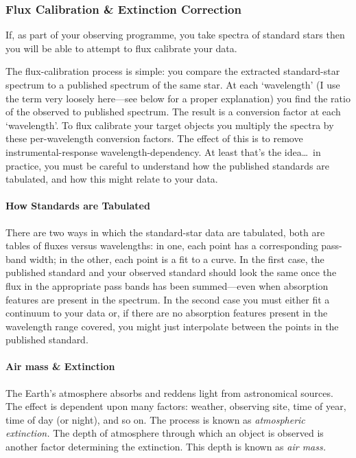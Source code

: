\documentclass[twoside,11pt]{starlink}
\providecommand{\mlabel}[1]{\xlabel{#1}\label{#1}}
\providecommand{\scspec}[2]{#1}
\begin{document}
\subsubsection{\mlabel{flux_calibration}Flux Calibration \&
               Extinction Correction}

If, as part of your observing programme, you take spectra of standard stars
then you will be able to attempt to flux calibrate your data.

The flux-calibration process is simple: you compare the extracted
standard-star spectrum to a published spectrum of the same star.  At each
`wavelength' (I use the term very loosely here\scspec{---}{ - }see below for a
proper explanation) you find the ratio of the observed to published spectrum.
The result is a conversion factor at each `wavelength'.
To flux calibrate your target objects you multiply the spectra by these
per-wavelength conversion factors.  The effect of this is to remove
instrumental-response wavelength-dependency.  At least that's the
idea\ldots\ in practice, you must be careful to understand how the
published standards are tabulated, and how this might relate to your data.

\paragraph{How Standards are Tabulated}

There are two ways in which the standard-star data are tabulated,
both are tables of fluxes versus wavelengths:
in one, each point has a corresponding pass-band width;
in the other, each point is a fit to a
 curve.
In the first case, the published standard and your observed standard should
look the same once the flux in the appropriate pass bands has been
summed\scspec{---}{ - }even when absorption features are present in the
spectrum.  In the second case you must either fit a continuum to your
data or, if there are no absorption features present in the wavelength range
covered, you might just interpolate between the points in the published
standard.

\paragraph{\mlabel{airmass}Air mass \& Extinction}

The Earth's atmosphere absorbs and reddens light from astronomical sources.
The effect is dependent upon many factors: weather, observing site, time of
year, time of day (or night), and so on.
The process is known as {\sl atmospheric extinction.}
The depth of atmosphere through which an object is
observed is another factor determining the extinction.
This depth is known as {\sl air mass.}
\end{document}
